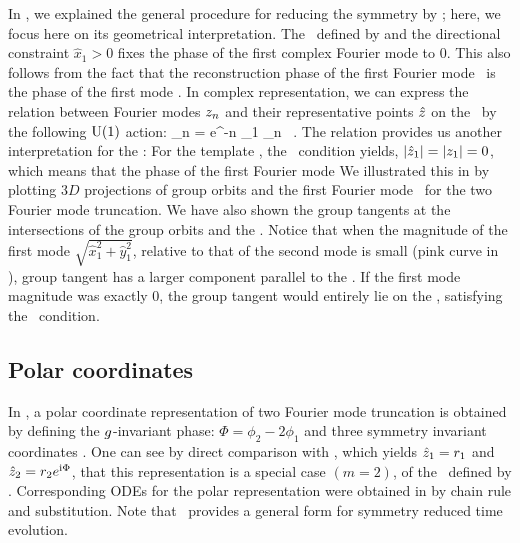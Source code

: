 In , we explained the general procedure for reducing
the  symmetry by \mslices ; here, we focus here on its geometrical interpretation. 
The \slice\ defined by  and the directional constraint $\hat{x}_1 > 0$
%
%
fixes the phase of the first complex Fourier mode to $0$. This also follows from 
the fact that the reconstruction phase of the first Fourier mode \slice\ is the
phase of the first mode . In complex representation, we can express
the relation between Fourier modes $z_n$ and their representative points 
$\hat{z}$ on the \slicePlane\ by the following $\textrm{U}(1)$ action:
\beq
	\sspRedC_n = e^{-\ii n \phi_1} \sspC_n \, .
The relation  provides us
another interpretation for the \sliceBord :  For the template ,
the \sliceBord\ condition  yields,
$|\hat{z}_1| = |z_1| = 0$, which means that the phase of the first Fourier
mode  
%
We illustrated this in  by plotting $3D$ projections of 
 group orbits and the first Fourier mode \slicePlane\ for the two Fourier
mode truncation. We have also shown the group tangents at the intersections of the
group orbits and the \slicePlane . Notice that when the magnitude of the first
mode $\sqrt{\hat{x}_1^2 + \hat{y}_1^2}$, relative to that of the second mode is
small (pink curve in ), group tangent has a larger
component parallel to the \slicePlane . If the first mode magnitude was exactly
$0$, the group tangent would entirely lie on the \slicePlane , satisfying the
\sliceBord\ condition. 

\subsection{Polar coordinates}
\label{s-polar}

In , a polar coordinate representation of two Fourier mode 
truncation is obtained by defining the $g$-invariant phase: $\Phi = \phi_2 - 2 \phi_1$
and three symmetry invariant coordinates .
One can see by direct comparison with , which
yields $\hat{z}_1 = r_1$ and $\hat{z}_2 = r_2 e^{\mathrm{i} \Phi}$, that this
representation is a special case $(m=2)$, of the \slice\ defined by
. Corresponding ODEs for the polar representation
were obtained in  by  chain rule and substitution. Note
that \mslices\ provides a general form  for symmetry
reduced time evolution.
